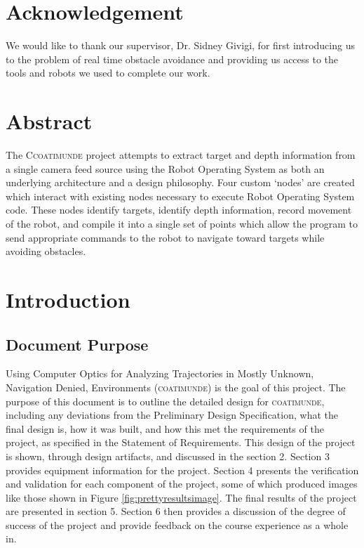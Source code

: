 \documentclass{article}[12]
\begin{document}

\section*{Acknowledgement}

We would like to thank our supervisor, Dr. Sidney Givigi, for first introducing us to the problem of real time obstacle avoidance and providing us access to the tools and robots we used to complete our work.

\section*{Abstract}

The C\textsc{coatimunde} project attempts to extract target and depth information from a single camera feed source using the Robot Operating System as both an underlying architecture and a design philosophy. Four custom `nodes' are created which interact with existing nodes necessary to execute Robot Operating System code. These nodes identify targets, identify depth information, record movement of the robot, and compile it into a single set of points which allow the program to send appropriate commands to the robot to navigate toward targets while avoiding obstacles.
	
\tableofcontents \newpage



\section{Introduction}

	\subsection{Document Purpose}
	
	Using Computer Optics for Analyzing Trajectories in Mostly Unknown, Navigation Denied, Environments (\textsc{coatimunde}) is the goal of this project. The purpose of this document is to outline the detailed design for \textsc{coatimunde}, including any deviations from the Preliminary Design Specification, what the final design is, how it was built, and how this met the requirements of the project, as specified in the Statement of Requirements. 
This design of the project is shown, through design artifacts, and discussed in the section 2. Section 3 provides equipment information for the project. Section 4 presents the verification and validation for each component of the project, some of which produced images like those shown in Figure \ref{fig:prettyresultsimage}. The final results of the project are presented in section 5. Section 6 then provides a discussion of the degree of success of the project and provide feedback on the course experience as a whole in.
	
\end{document}
